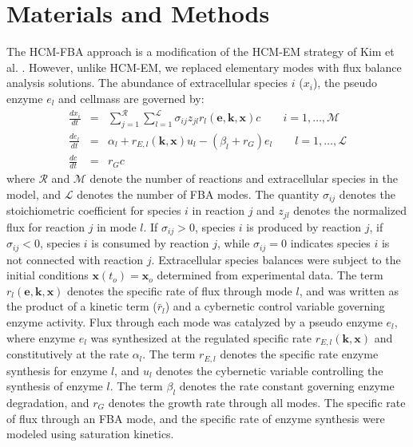 \documentclass[10pt,twocolumn,twoside,final]{IEEEtran}
\begin{document}
\section{Materials and Methods}
The HCM-FBA approach is a modification of the HCM-EM strategy of Kim et al. \cite{2008_kim_varner_ramkrishna_BiotechProg}. However, unlike HCM-EM, we replaced elementary modes with flux balance analysis solutions. The abundance of extracellular species $i$ ($x_{i}$), the pseudo enzyme $e_{l}$ and cellmass are governed by:
\begin{eqnarray}\nonumber
	\frac{dx_{i}}{dt}  & = &  \sum_{j = 1}^{\mathcal{R}}\sum_{l = 1}^{\mathcal{L}}\sigma_{ij}z_{jl}r_{l}\left(\mathbf{e},\mathbf{k},\mathbf{x}\right)c \qquad{i=1,\hdots,\mathcal{M}}\\\nonumber
  \frac{de_{l}}{dt}  & = & \alpha_{l} + r_{E,l}\left(\mathbf{k},\mathbf{x}\right)u_{l} - \left(\beta_{l}+r_{G}\right)e_{l} \qquad l=1,\hdots,\mathcal{L} \\\nonumber
  \frac{dc}{dt} & = & r_{G}c
\end{eqnarray}
where $\mathcal{R}$ and $\mathcal{M}$ denote the number of reactions and extracellular species in the model, and $\mathcal{L}$ denotes the number of FBA modes.
The quantity $\sigma_{ij}$ denotes the stoichiometric coefficient for species $i$ in reaction $j$ and $z_{jl}$ denotes the normalized flux for reaction $j$ in mode $l$.
If $\sigma_{ij}>0$, species $i$ is produced by reaction $j$,
if $\sigma_{ij}<0$, species $i$ is consumed by reaction $j$, while $\sigma_{ij} = 0$ indicates species $i$ is not connected with reaction $j$.
Extracellular species balances were subject to the initial conditions $\mathbf{x}\left(t_{o}\right) = \mathbf{x}_{o}$ determined from experimental data.
The term $r_{l}\left(\mathbf{e},\mathbf{k},\mathbf{x}\right)$ denotes the specific rate of flux through mode $l$, and was written as the product of a kinetic term ($\bar{r}_{l}$) and a cybernetic control variable governing enzyme activity. Flux through each mode was catalyzed by a pseudo enzyme $e_{l}$, where enzyme $e_{l}$ was synthesized at the regulated specific rate $r_{E,l}\left(\mathbf{k},\mathbf{x}\right)$ and constitutively at the rate $\alpha_{l}$. The term $r_{E,l}$ denotes the specific rate enzyme synthesis for enzyme $l$, and $u_{l}$ denotes the cybernetic variable controlling the synthesis of enzyme $l$. The term $\beta_{l}$ denotes the rate constant governing enzyme degradation, and $r_{G}$ denotes the growth rate through all modes.
The specific rate of flux through an FBA mode, and the specific rate of enzyme synthesis were modeled using saturation kinetics.
\end{document}
